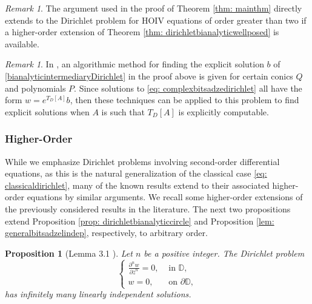 \documentclass[12pt,reqno]{amsart}
\newtheorem{prop}[theorem]{Proposition}
\theoremstyle{definition}
\theoremstyle{remark}
\newtheorem{comm}[theorem]{Remark}
\newcommand{\p}{\partial}
\newcommand{\z}{\bar z}
\newcommand{\disk}{\mathbb{D}}
\begin{document}
    \begin{comm}\label{remark: hoivdbvp}
        The argument used in the proof of Theorem \ref{thm: mainthm} directly extends to the Dirichlet problem for HOIV equations of order greater than two if a higher-order extension of Theorem \ref{thm: dirichletbianalyticwellposed} is available.
    \end{comm}

    \begin{comm}\label{remark: complexremark}
        In \cite{Dirichletbianalytic}, an algorithmic method for finding the explicit solution $b$ of \eqref{bianalyticintermediaryDirichlet} in the proof above is given for certain conics $Q$ and polynomials $P$. Since solutions to \eqref{eq: complexbitsadzedirichlet} all have the form $w = e^{T_D[A]} b$, then these techniques can be applied to this problem to find explicit solutions when $A$ is such that $T_D[A]$ is explicitly computable.
    \end{comm}


            \subsubsection{Higher-Order}

            While we emphasize Dirichlet problems involving second-order differential equations, as this is the natural generalization of the classical case \eqref{eq: classicaldirichlet}, many of the known results extend to their associated higher-order equations by similar arguments. We recall some higher-order extensions of the previously considered results in the literature. The next two propositions extend Proposition \ref{prop: dirichletbianalyticcircle} and Proposition \ref{lem: generalbitsadzelindep}, respectively, to arbitrary order.

            \begin{prop}[Lemma 3.1 \cite{Karaca20}]\label{prop: higherordercomplexdirichlet}
                 Let $n$ be a positive integer. The Dirichlet problem 
                \[
                    \begin{cases}
                    \frac{\p^n w}{\p\z^n} = 0,  & \text{ in } \disk,\\
                    w = 0, & \text{ on } \p \disk,
                \end{cases}
                \]
                has infinitely many linearly independent solutions.
            \end{prop}
\end{document}
